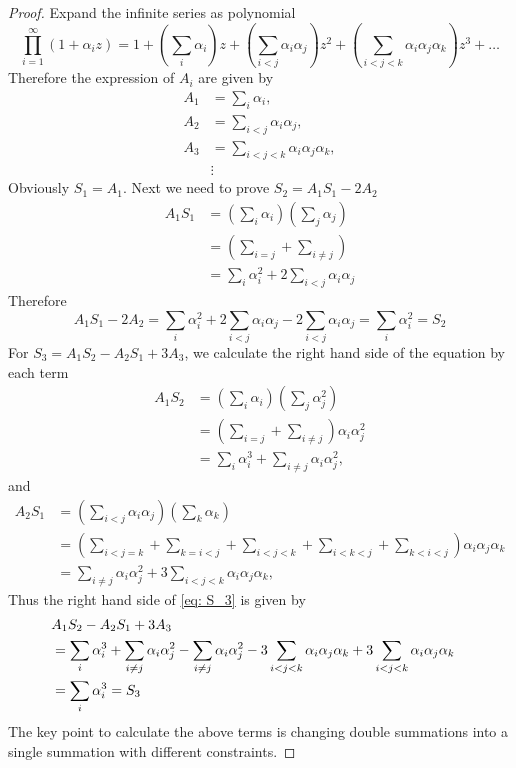 \documentclass[10pt]{article}
\begin{document}
\begin{proof}
	Expand the infinite series as polynomial
	\begin{equation}
		\prod_{i=1}^{\infty} (1 + \alpha_i z) = 1 + \left(\sum_i \alpha_i \right) z + \left(\sum_{i < j} \alpha_i \alpha_j \right) z^2 + \left(\sum_{i < j < k} \alpha_i \alpha_j \alpha_k \right) z^3 + \dots
	\end{equation}
	Therefore the expression of $A_i$ are given by
	\begin{align*}
		A_1 &= \sum_i \alpha_i,\\
		A_2 &= \sum_{i < j} \alpha_i \alpha_j, \\
		A_3 &= \sum_{i < j < k} \alpha_i \alpha_j \alpha_k, \\
		&\vdots
	\end{align*}
	Obviously $S_1 = A_1$. Next we need to prove $S_2 = A_1 S_1 - 2 A_2$
	\begin{align*}
		A_1 S_1 &= \left( \sum_i \alpha_i \right) \left( \sum_j \alpha_j \right) \\
		&= \left( \sum_{i=j} + \sum_{i \neq j} \right) \\
		&= \sum_i \alpha_i^2 + 2\sum_{i < j} \alpha_i \alpha_j
	\end{align*}
	Therefore
	\begin{equation}
		A_1 S_1 - 2 A_2 = \sum_i \alpha_i^2 + 2\sum_{i < j} \alpha_i \alpha_j - 2\sum_{i < j} \alpha_i \alpha_j = \sum_i \alpha_i^2 = S_2
	\end{equation}
	For $S_3 = A_1 S_2 - A_2 S_1 + 3 A_3$, we calculate the right hand side of the equation by each term
	\begin{align*}
		A_1 S_2 &= \left( \sum_i \alpha_i \right) \left( \sum_j \alpha_j^2 \right) \\
		&= \left(\sum_{i=j} + \sum_{i \neq j} \right) \alpha_i \alpha_j^2 \\
		&= \sum_i \alpha_i^3 + \sum_{i \neq j} \alpha_i \alpha_j^2,
	\end{align*}
	and
	\begin{align*}
		A_2 S_1 &= \left( \sum_{i < j} \alpha_i \alpha_j \right) \left( \sum_k \alpha_k \right) \\
		&= \left(\sum_{i < j=k} + \sum_{k= i < j} + \sum_{i<j<k} + \sum_{i<k<j} + \sum_{k<i<j}\right) \alpha_i \alpha_j \alpha_k \\
		&= \sum_{i \neq j}\alpha_i \alpha_j^2 + 3 \sum_{i<j<k} \alpha_i \alpha_j \alpha_k,
	\end{align*}
	Thus the right hand side of \eqref{eq: S_3} is given by
	\begin{align*}
		\lefteqn{A_1 S_2 - A_2 S_1 + 3 A_3} \\
		&= \sum_i \alpha_i^3 + \sum_{i \neq j} \alpha_i \alpha_j^2 - \sum_{i \neq j}\alpha_i \alpha_j^2 - 3 \sum_{i<j<k} \alpha_i \alpha_j \alpha_k + 3 \sum_{i<j<k} \alpha_i \alpha_j \alpha_k \\
		&= \sum_i \alpha_i^3 = S_3
	\end{align*}
	The key point to calculate the above terms is changing double summations into a single summation with different constraints.
\end{proof}
\end{document}
